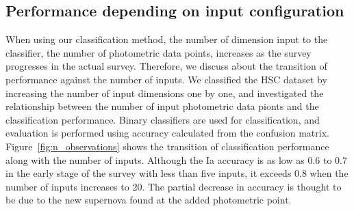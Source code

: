 \documentclass[useamsfonts]{pasj01}
\begin{document}
\subsection{Performance depending on input configuration}
%
When using our classification method, the number of dimension input to the classifier, the number of photometric data points, increases as the survey progresses in the actual survey.
Therefore, we discuss about the transition of performance against the number of inputs.
We classified the HSC dataset by increasing the number of input dimensions one by one, and investigated the relationship between the number of input photometric data pionts and the classification performance.
Binary classifiers are used for classification, and evaluation is performed using accuracy calculated from the confusion matrix.
Figure\ \ref{fig:n_observations} shows the transition of classification performance along with the number of inputs.
Although the Ia accuracy is as low as 0.6 to 0.7 in the early stage of the survey with less than five inputs, it exceeds 0.8 when the number of inputs increases to 20.
The partial decrease in accuracy is thought to be due to the new supernova found at the added photometric point.
\end{document}
